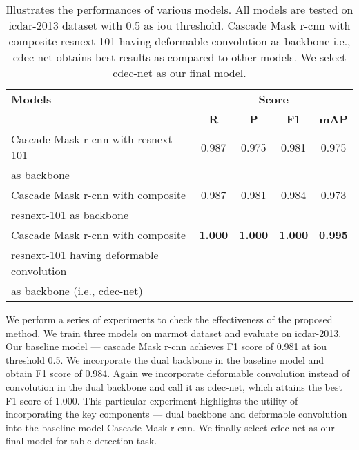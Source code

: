 \documentclass[a4paper,conference]{IEEEtran}
\begin{document}
\begin{table}[ht!]
\addtolength{\tabcolsep}{-4.0pt}
\begin{center}
\begin{tabular}{|l|c c c c|} \hline
\textbf{Models} &\multicolumn{4}{|c|}{\textbf{Score}} \\ \cline{2-5}
 &\textbf{R} &\textbf{P} &\textbf{F1} &\textbf{mAP} \\ \hline 
Cascade Mask {\sc r-cnn} with {\sc r}es{\sc n}e{\sc x}t-101 &0.987 &0.975 &0.981 &0.975 \\
 as backbone  &    &    &   & \\ \hline
Cascade Mask {\sc r-cnn} with composite &0.987 &0.981 &0.984 &0.973 \\
{\sc r}es{\sc n}e{\sc x}t-101 as backbone &   &  &   & \\ \hline
Cascade Mask {\sc r-cnn} with composite &\textbf{1.000} &\textbf{1.000} &\textbf{1.000} &\textbf{0.995}\\ 
{\sc r}es{\sc n}e{\sc x}t-101 having deformable convolution &  & &  & \\ 
as backbone (i.e., {\sc cd}e{\sc c-n}et) &  & &  & \\ \hline
\end{tabular}
\end{center}
\caption{Illustrates the performances of various models. All models are tested on {\sc icdar-2013} dataset with 0.5 as {\sc i}o{\sc u} threshold. Cascade Mask {\sc r-cnn} with composite {\sc r}es{\sc n}e{\sc x}t-101 having deformable convolution as backbone i.e., {\sc cd}e{\sc c-n}et obtains best results as compared to other models. We select {\sc cd}e{\sc c-n}et as our final model. \label{ablation_study_table}}
\end{table}
 
We perform a series of experiments to check the effectiveness of the proposed method. We train three models on {\sc m}armot dataset and evaluate on {\sc icdar}-2013. Our baseline model --- cascade Mask {\sc r-cnn} achieves F1 score of 0.981 at {\sc i}o{\sc u} threshold 0.5. We incorporate the dual backbone in the baseline model and obtain F1 score of 0.984. Again we incorporate deformable convolution instead of convolution in the dual backbone and call it as {\sc cd}e{\sc c-n}et, which attains the best F1 score of 1.000. This particular experiment highlights the utility of incorporating the key components --- dual backbone and deformable convolution into the baseline model Cascade Mask {\sc r-cnn}. We finally select {\sc cd}e{\sc c-n}et as our final model for table detection task.
\end{document}
